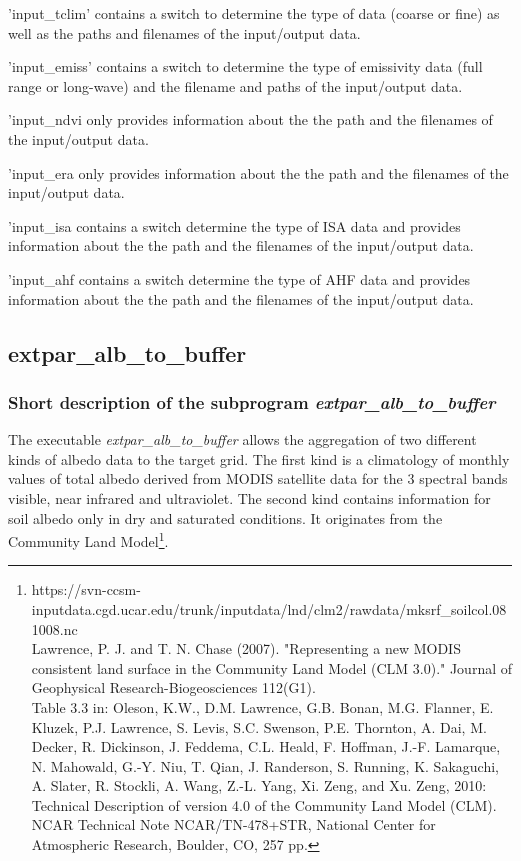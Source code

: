 \documentclass[a4paper,10pt,DIV14,BCOR1cm,titlepage,twoside]{scrartcl}
\begin{document}
\noindent'input\_tclim' contains a switch to determine the type of data (coarse or fine) as well as the paths and filenames of the input/output data.

\noindent'input\_emiss' contains a switch to determine the type of emissivity data (full range or long-wave) and the filename and paths of the input/output data.

\noindent'input\_ndvi only provides information about the the path and the filenames of the input/output data.

\noindent'input\_era only provides information about the the path and the filenames of the input/output data.

\noindent'input\_isa contains a switch determine the type of ISA data and  provides information about the the path and the filenames of the input/output data.

\noindent'input\_ahf contains a switch determine the type of AHF data and  provides information about the the path and the filenames of the input/output data.

\subsection{extpar\_alb\_to\_buffer}\label{extpar_alb_to_buffer}
\subsubsection{Short description of the subprogram \textit{extpar\_alb\_to\_buffer}}
The executable \textit{extpar\_alb\_to\_buffer} allows the aggregation of two different kinds of albedo data to the target grid. The first kind is a climatology of monthly values of total albedo derived from MODIS satellite data for the 3 spectral bands visible, near infrared and ultraviolet. The second kind contains information for soil albedo only in dry and saturated conditions. It originates from the Community Land Model\footnote{https://svn-ccsm-inputdata.cgd.ucar.edu/trunk/inputdata/lnd/clm2/rawdata/mksrf\_soilcol.081008.nc \\ Lawrence, P. J. and T. N. Chase (2007). "Representing a new MODIS consistent land surface in the Community Land Model (CLM 3.0)." Journal of Geophysical Research-Biogeosciences 112(G1). \\Table 3.3 in: Oleson, K.W., D.M. Lawrence, G.B. Bonan, M.G. Flanner, E. Kluzek, P.J. Lawrence, S. Levis, S.C. Swenson, P.E. Thornton, A. Dai, M. Decker, R. Dickinson, J. Feddema, C.L. Heald, F. Hoffman, J.-F. Lamarque, N. Mahowald, G.-Y. Niu, T. Qian, J. Randerson, S. Running, K. Sakaguchi, A. Slater, R. Stockli, A. Wang, Z.-L. Yang, Xi. Zeng, and Xu. Zeng, 2010: Technical Description of version 4.0 of the Community Land Model (CLM). NCAR Technical Note NCAR/TN-478+STR, National Center for Atmospheric Research, Boulder, CO, 257 pp.}.\par\medskip\noindent
\end{document}

